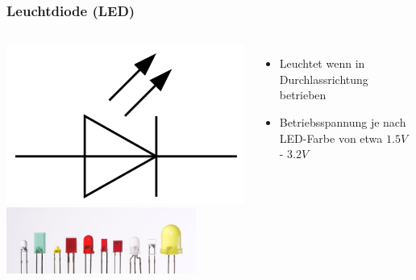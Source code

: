 \begin{frame}
    \frametitle{Leuchtdiode (LED)}
    \begin{columns}[c]
        \column[c]{5cm}
        \begin{center}
            \includegraphics[width=1\textwidth]{a05/Symbol_LED.png}\\
            \includegraphics[width=0.8\textwidth]{a05/Verschiedene_LEDs.jpg}
            \tiny \hyperlink{refs}{\cite{wm}}
        \end{center}
        \column{5cm}
    \begin{itemize}
			\item Leuchtet wenn in Durchlassrichtung betrieben
			\item Betriebsspannung je nach LED-Farbe von etwa $1.5V$ - $3.2V$
    \end{itemize}
    \end{columns}
\end{frame}

